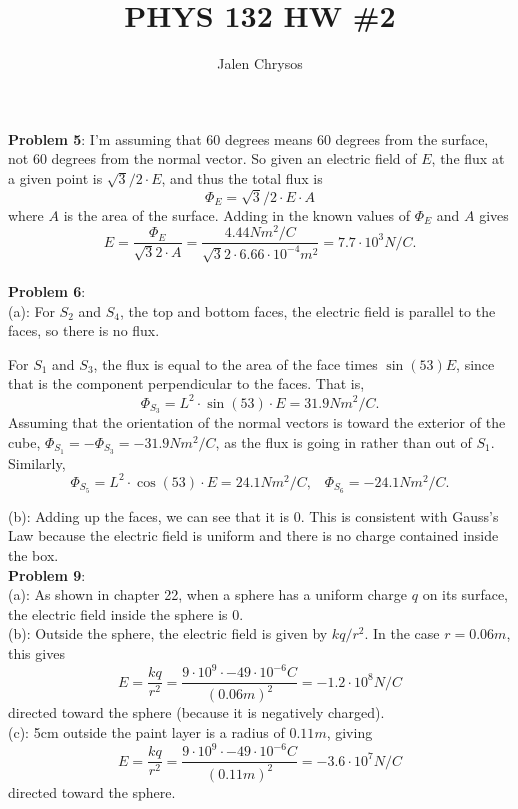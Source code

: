 \documentclass{amsart}
\title{PHYS 132 HW \#2}
\author{Jalen Chrysos}
\begin{document}
	
	\maketitle
	
	\textbf{Problem 5}: I'm assuming that $60$ degrees means $60$ degrees from the surface, not $60$ degrees from the normal vector. So given an electric field of $E$, the flux at a given point is $\sqrt{3}/2 \cdot E$, and thus the total flux is 
	$$
	\Phi_E = \sqrt{3}/2 \cdot E \cdot A
	$$
	where $A$ is the area of the surface. Adding in the known values of $\Phi_E$ and $A$ gives
	$$
	E = \frac{\Phi_E}{\sqrt{3}{2} \cdot A} = \frac{4.44 N m^2/C}{\sqrt{3}{2} \cdot 6.66 \cdot 10^{-4} m^2} = 7.7 \cdot 10^3 N/C.
	$$\\
	
	\textbf{Problem 6}: \\
	(a): For $S_2$ and $S_4$, the top and bottom faces, the electric field is parallel to the faces, so there is no flux. 
	
	For $S_1$ and $S_3$, the flux is equal to the area of the face times $\sin(53)E$, since that is the component perpendicular to the faces. That is,
	$$
	\Phi_{S_3} = L^2 \cdot \sin(53)\cdot E = 31.9 N m^2 /C.
	$$ 
	Assuming that the orientation of the normal vectors is toward the exterior of the cube, $\Phi_{S_1} = -\Phi_{S_3} = -31.9 Nm^2/C$, as the flux is going in rather than out of $S_1$.
	Similarly,
	$$
	\Phi_{S_5} = L^2 \cdot \cos(53)\cdot E = 24.1 N m^2 /C, \;\;\; \Phi_{S_6} = -24.1 N m^2/C.
	$$ 
	
	(b): Adding up the faces, we can see that it is 0. This is consistent with Gauss's Law because the electric field is uniform and there is no charge contained inside the box.\\
	
	\textbf{Problem 9}: \\
	
	(a): As shown in chapter 22, when a sphere has a uniform charge $q$ on its surface, the electric field inside the sphere is 0.\\
	
	(b): Outside the sphere, the electric field is given by $kq/r^2$. In the case $r=0.06m$, this gives
	$$
	E = \frac{kq}{r^2} = \frac{9\cdot 10^9 \cdot -49 \cdot 10^{-6} C}{(0.06 m )^2} = -1.2 \cdot 10^8 N/C
	$$
	directed toward the sphere (because it is negatively charged).\\
	
	(c): 5cm outside the paint layer is a radius of $0.11m$, giving
	$$
	E = \frac{kq}{r^2} = \frac{9\cdot 10^9 \cdot -49 \cdot 10^{-6} C}{(0.11 m )^2} = -3.6 \cdot 10^7 N/C
	$$
	directed toward the sphere.\\
	
\end{document}
